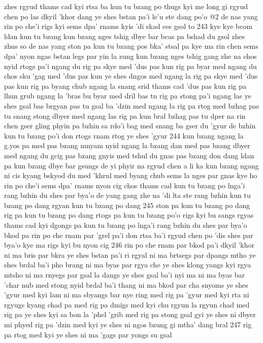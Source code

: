 zhes rgyud thams cad kyi rtsa ba kun tu bzang po thugs kyi me long gi rgyud chen po las
dkyil 'khor dang ye shes bstan pa'i le'u ste dang po'o
@2
de nas yang rin po che'i rigs kyi sems dpa' rnams kyis 'di skad ces gsol to
243
kye kye bcom ldan kun tu bzang
kun bzang nges tshig dbye bar bcas pa bshad du gsol
zhes zhus so
de nas yang ston pa kun tu bzang pos bka' stsal pa
kye ma rin chen sems dpa' nyon
ngas bstan legs par yin la zung
kun bzang nges tshig gang zhe na
chos nyid rtogs pa'i ngang du rig pa skye med 'dus pas kun
rig pa byar med ngang du chos sku 'gag med 'dus pas kun
ye shes dngos med ngang la rig pa skye med 'dus pas kun
rig pa byang chub ngang la snang srid thams cad 'dus pas kun
rig pa lhun grub ngang la 'bras bu byar med dril bas tu
rig pa stong pa'i ngang las ye shes gsal bas brgyan pas tu
gsal ba 'dzin med ngang la rig pa rtog med bzhag pas tu
snang stong dbyer med ngang las rig pa kun bral bzhag pas tu
dper na rin chen gser gling phyin pa bzhin
sa rdo'i bag med snang ba gser du 'gyur
de bzhin kun tu bzang po'i don rtogs rnam rtog ye shes 'gyur
244
kun bzang ngang la g.yos pa med pas bzang
mnyam nyid ngang la bzang dan med pas bzang
dbyer med ngang du gcig pas bzang
gnyis med tshul du gnas pas bzang
don dang ldan pa kun bzang dbye bar gsungs
de yi phyir na rgyud chen a li ka
kun bzang ngang ni cis kyang bskyod du med
'khrul med byang chub sems la nges par gnas
kye ho rin po che'i sems dpa' rnams nyon cig
chos thams cad kun tu bzang po lnga'i rang bzhin du shes par bya'o
de yang gang zhe na 'di lta ste
rang bzhin kun tu bzang po dang
rgyan kun tu bzang po dang
245
ston pa kun tu bzang po dang
rig pa kun tu bzang po dang
rtogs pa kun tu bzang po'o
rigs kyi bu sangs rgyas thams cad kyi dgongs pa kun tu bzang po lnga'i rang bzhin du shes par bya'o
bkod pa rin po che rnam par 'grel pa'i don
rtsa ba'i rgyud chen po 'dis shes par bya'o
kye ma rigs kyi bu nyon cig
246
rin po che rnam par bkod pa'i dkyil 'khor ni ma bris par bkra
ye shes bstan pa'i ri rgyal ni ma brtsegs par dpangs mtho
ye shes brdal ba'i pho brang ni ma byas par rgya che
ye shes klong yangs kyi rgya mtsho ni ma rnyegs par gsal la dangs
ye shes gsal ba'i nyi ma ni ma byas bar 'char nub med
stong nyid brdal ba'i thang ni ma bkod par cha snyoms
ye shes 'gyur med kyi lam ni ma sbyangs bar nye ring med
rig pa 'gyur med kyi rta ni rgyugs kyang chad pa med
rig pa dmigs med kyi chu rgyun la rgyun chad med
rig pa ye shes kyi sa bon la 'phel 'grib med
rig pa stong gsal gyi ye shes ni dbyer mi phyed
rig pa 'dzin med kyi ye shes ni ngos bzung gi mtha' dang bral
247
rig pa rtog med kyi ye shes ni ma 'gags par yongs su gsal
